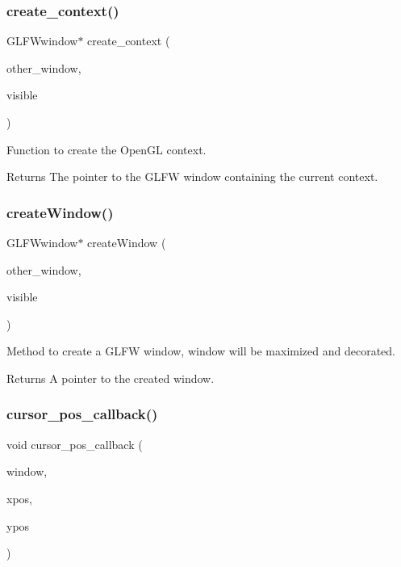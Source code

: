 \subsubsection{\texorpdfstring{create\+\_\+context()}{create\_context()}}
{\footnotesize\ttfamily G\+L\+F\+Wwindow$\ast$ create\+\_\+context (\begin{DoxyParamCaption}\item[{G\+L\+F\+Wwindow $\ast$}]{other\+\_\+window,  }\item[{bool}]{visible }\end{DoxyParamCaption})}

Function to create the Open\+GL context.

\begin{DoxyReturn}{Returns}
The pointer to the G\+L\+FW window containing the current context. 
\end{DoxyReturn}
\mbox{\label{Window-Management_8hpp_a9877855b1f20b67790eeace6c28ec048}} 
\subsubsection{\texorpdfstring{create\+Window()}{createWindow()}}
{\footnotesize\ttfamily G\+L\+F\+Wwindow$\ast$ create\+Window (\begin{DoxyParamCaption}\item[{G\+L\+F\+Wwindow $\ast$}]{other\+\_\+window,  }\item[{bool}]{visible }\end{DoxyParamCaption})}

Method to create a G\+L\+FW window, window will be maximized and decorated.

\begin{DoxyReturn}{Returns}
A pointer to the created window. 
\end{DoxyReturn}
\mbox{\label{Window-Management_8hpp_ab9a970cff09c5a4031b814242706b4f6}} 
\subsubsection{\texorpdfstring{cursor\+\_\+pos\+\_\+callback()}{cursor\_pos\_callback()}}
{\footnotesize\ttfamily void cursor\+\_\+pos\+\_\+callback (\begin{DoxyParamCaption}\item[{G\+L\+F\+Wwindow $\ast$}]{window,  }\item[{double}]{xpos,  }\item[{double}]{ypos }\end{DoxyParamCaption})}

